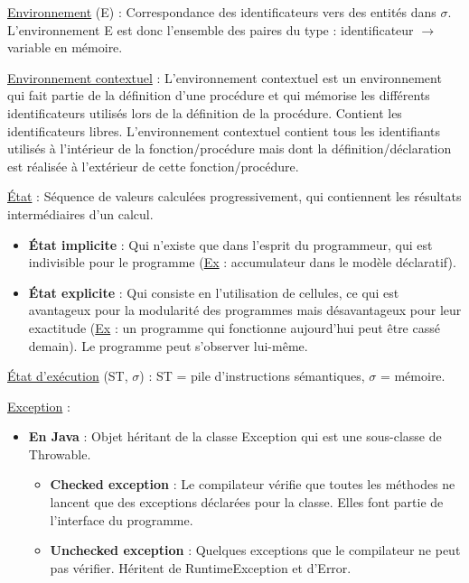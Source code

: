 \documentclass[fr,license=none,skiptoc]{../../../eplsummary}
\begin{document}
\begin{flushleft}
\textcolor{mauvedef}{\underline{Environnement}} (\textcolor{miorangerouge}{E}) : Correspondance des identificateurs vers des entités dans \textcolor{miorangerouge}{$\sigma$}. L’environnement \textcolor{miorangerouge}{E} est donc l'ensemble des paires du type : identificateur $\rightarrow$ variable en mémoire.\bigbreak

\textcolor{mauvedef}{\underline{Environnement contextuel}} : L’environnement contextuel est un environnement qui fait partie de la définition d’une procédure et qui mémorise les différents identificateurs utilisés lors de la définition de la procédure. Contient les identificateurs libres. L'environnement contextuel contient tous les identifiants utilisés à l'intérieur de la fonction/procédure mais dont la définition/déclaration est réalisée à l'extérieur de cette fonction/procédure.  \bigbreak

\textcolor{mauvedef}{\underline{État}} : Séquence de valeurs calculées progressivement, qui contiennent les résultats intermédiaires d'un calcul.
\begin{itemize}
\item \textbf{État implicite} : Qui n'existe que dans l'esprit du programmeur, qui est indivisible pour le programme (\underline{Ex} : accumulateur dans le modèle déclaratif).
\item \textbf{État explicite} : Qui consiste en l'utilisation de cellules, ce qui est avantageux pour la modularité des programmes mais désavantageux pour leur exactitude (\underline{Ex} : un programme qui fonctionne aujourd'hui peut être cassé demain). Le programme peut s'observer lui-même.
\end{itemize}
\bigbreak


\textcolor{mauvedef}{\underline{État d’exécution}} \textcolor{miorangerouge}{(ST, $\sigma$)} : \textcolor{miorangerouge}{ST} = pile d’instructions sémantiques, \textcolor{miorangerouge}{$\sigma$} = mémoire.\bigbreak


\textcolor{mauvedef}{\underline{Exception}} :

\begin{itemize}
\item \textbf{En Java} : Objet héritant de la classe Exception qui est une sous-classe de Throwable.

\begin{itemize}[label=\textbullet]
\item \textbf{Checked exception} : Le compilateur vérifie que toutes les méthodes ne lancent que des exceptions déclarées pour la classe. Elles font partie de l'interface du programme.
\item \textbf{Unchecked exception} : Quelques exceptions que le compilateur ne peut pas vérifier. Héritent de RuntimeException et d'Error.
\end{itemize}


\end{itemize}
\end{flushleft}
\end{document}
